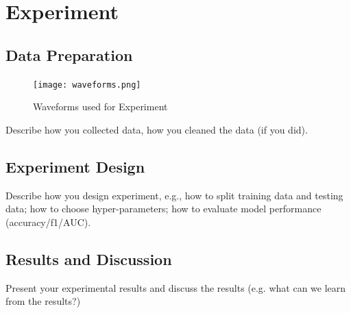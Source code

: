 \documentclass{article}
\begin{document}
\section{Experiment}

\subsection{Data Preparation}

\begin{figure}[H]
    \centering
    \texttt{[image: waveforms.png]}
    \caption{Waveforms used for Experiment}
    \label{fig: Waveforms used for Experiment}
\end{figure}


Describe how you collected data, how
you cleaned the data (if you did).

\subsection{Experiment Design}


Describe how you design experiment,
e.g., how to split training data and testing
data; how to choose hyper-parameters; how
to evaluate model performance (accuracy/f1/AUC).

\subsection{Results and Discussion}

Present your experimental results and discuss
the results (e.g. what can we learn from the
results?)


\end{document}
